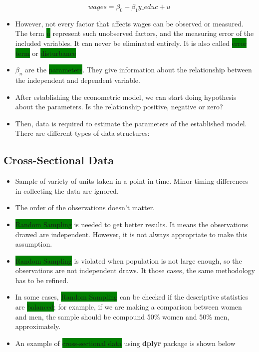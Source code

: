 \documentclass[
]{book}
\newcommand{\key}[1]{\colorbox{green}{#1}}
\theoremstyle{definition}
\theoremstyle{definition}
\theoremstyle{definition}
\theoremstyle{definition}
\theoremstyle{remark}
\begin{document}
\[wages=\beta_0+\beta_1y\_educ+u\]

\begin{itemize}
\item
  However, not every factor that affects wages can be observed or measured. The term \key{u} represent such unobserved factors, and the measuring error of the included variables. It can never be eliminated entirely. It is also called \key{error term} or \key{disturbance}
\item
  \(\beta_n\) are the \key{parameters}. They give information about the relationship between the independent and dependent variable.
\item
  After establishing the econometric model, we can start doing hypothesis about the parameters. Is the relationship positive, negative or zero?
\item
  Then, data is required to estimate the parameters of the established model. There are different types of data structures:
\end{itemize}

\subsection*{Cross-Sectional Data}\label{cross-sectional-data}

\begin{itemize}
\item
  Sample of variety of units taken in a point in time. Minor timing differences in collecting the data are ignored.
\item
  The order of the observations doesn't matter.
\item
  \key{Random Sampling} is needed to get better results. It means the observations drawed are independent. However, it is not always appropriate to make this assumption.
\item
  \key{Random Sampling} is violated when population is not large enough, so the observations are not independent draws. It those cases, the same methodology has to be refined.
\item
  In some cases, \key{Random Sampling} can be checked if the descriptive statistics are \key{balanced}; for example, if we are making a comparison between women and men, the sample should be compound 50\% women and 50\% men, approximately.
\item
  An example of \key{cross-sectional data} using \textbf{dplyr} package \citep{dplyr} is shown below
\end{itemize}
\end{document}
